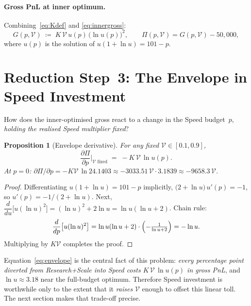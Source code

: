 \documentclass[11pt,a4paper]{article}
\newtheorem{proposition}{Proposition}
\theoremstyle{definition}
\theoremstyle{remark}
\newcommand{\Sp}{\mathcal{V}}
\begin{document}
\paragraph{Gross PnL at inner optimum.} Combining~\eqref{eq:Kdef} and
\eqref{eq:innergross}:
\begin{equation}\label{eq:Gdef}
G(p,\Sp)\;\coloneqq\;K\,\Sp\,u(p)\,\bigl(\ln u(p)\bigr)^2,
\qquad \Pi(p,\Sp)=G(p,\Sp)-50{,}000,
\end{equation}
where \(u(p)\) is the solution of \(u(1+\ln u)=101-p\).

\section{Reduction Step~3: The Envelope in Speed Investment}

How does the inner-optimised gross react to a change in the Speed budget~\(p\),
\emph{holding the realised Speed multiplier fixed}?

\begin{proposition}[Envelope derivative]\label{prop:envelope}
For any fixed \(\Sp\in[0.1,0.9]\),
\begin{equation}\label{eq:envelope}
\frac{\partial \Pi}{\partial p}\bigg|_{\Sp\text{ fixed}}
\;=\;-K\,\Sp\,\ln u(p).
\end{equation}
At \(p=0\): \(\partial\Pi/\partial p=-K\Sp\,\ln 24.1403 \approx -3033.51\,\Sp\cdot 3.1839
\approx -9658.3\,\Sp\).
\end{proposition}

\begin{proof}
Differentiating \(u(1+\ln u)=101-p\) implicitly,
\(\bigl(2+\ln u\bigr)\,u'(p)=-1\), so \(u'(p)=-1/(2+\ln u)\).
Next, \(\dfrac{d}{du}\bigl[u(\ln u)^2\bigr]=(\ln u)^2+2\ln u=\ln u(\ln u+2)\).
Chain rule:
\[
\frac{d}{dp}\bigl[u(\ln u)^2\bigr]
=\ln u(\ln u+2)\cdot\Bigl(-\tfrac{1}{\ln u+2}\Bigr)
=-\ln u.
\]
Multiplying by \(K\Sp\) completes the proof.
\end{proof}

\begin{keybox}
Equation~\eqref{eq:envelope} is the central fact of this problem: \emph{every
percentage point diverted from Research+Scale into Speed costs
\(K\,\Sp\,\ln u(p)\) in gross PnL}, and \(\ln u\approx 3.18\) near the full-budget
optimum. Therefore Speed investment is worthwhile only to the extent that it
\emph{raises} \(\Sp\) enough to offset this linear toll. The next section makes
that trade-off precise.
\end{keybox}
\end{document}
